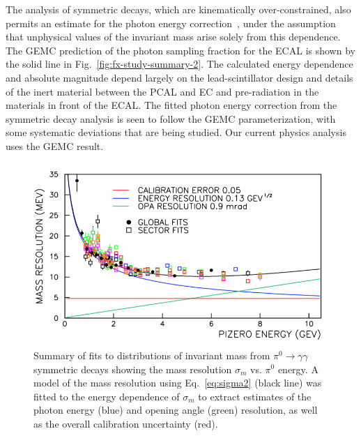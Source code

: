 The analysis of symmetric decays, which are kinematically over-constrained, also permits an estimate for the photon
energy correction~\cite{2006015}, under the assumption that unphysical values of the invariant mass arise solely
from this dependence. The GEMC prediction of the photon sampling fraction for the ECAL is shown by the solid line
in Fig.~\ref{fig:fx-study-summary-2}. The calculated energy dependence and absolute magnitude depend largely on
the lead-scintillator design and details of the inert material between the PCAL and EC and pre-radiation in the
materials in front of the ECAL. The fitted photon energy correction from the symmetric decay analysis is seen to
follow the GEMC parameterization, with some systematic deviations that are being studied. Our current physics
analysis uses the GEMC result.

\begin{figure}[h]
\centering
\includegraphics[width=1.0\columnwidth,keepaspectratio]{img/fx-study-summary.png}
\caption[]{Summary of fits to distributions of invariant mass from $\pi^0 \rightarrow \gamma \gamma$ symmetric
  decays showing the mass resolution $\sigma_m$ vs. $\pi^0$ energy. A model of the mass resolution using
  Eq.~\ref{eq:sigma2} (black line) was fitted to the energy dependence of $\sigma_m$ to extract estimates of the photon
  energy (blue) and opening angle (green) resolution, as well as the overall calibration uncertainty (red).}
\label{fig:fx-study-summary}
\end{figure}

